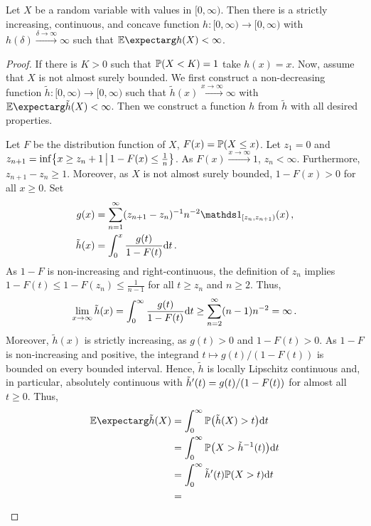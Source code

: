 %
\begin{lemma}\label{lmm:nondec:existence}
	Let $X$ be a random variable with values in $[0,\infty)$. Then there is a strictly increasing, continuous, and concave function $h \colon [0,\infty) \to [0,\infty)$ with $h(\delta)\xrightarrow{\delta\to\infty}\infty$ such that $\Ex{h(X)} < \infty$.
\end{lemma}
%
\begin{proof}
	If there is $K > 0$ such that $\mathbb{P}(X < K) = 1$ take $h(x) = x$. Now, assume that $X$ is not almost surely bounded.
	We first construct a non-decreasing function $\tilde h \colon [0,\infty) \to [0,\infty)$ such that $\tilde h (x) \xrightarrow{x\to\infty}\infty$ with $\Ex{\tilde h(X)} < \infty$.
	Then we construct a function $h$ from $\tilde h$ with all desired properties.
	
	Let $F$ be the distribution function of $X$, $F(x) = \mathbb{P}(X \leq x)$.
	Let $z_1 = 0$ and $z_{n+1} = \inf \mathopen{}\left\lbrace x\geq z_n +1 \,\big\vert\, 1-F(x) \leq \frac1n \right\rbrace\mathclose{}$. As $F(x)\xrightarrow{x\to\infty} 1$, $z_n < \infty$. Furthermore, $z_{n+1}-z_n \geq 1$. Moreover, as $X$ is not almost surely bounded, $1-F(x) > 0$ for all $x\geq 0$. Set 
	\begin{align*}
		g(x) &= \sum_{n=1}^\infty (z_{n+1}-z_n)^{-1}n^{-2}\ind_{[z_n, z_{n+1})} (x)
		\eqcm
		\\
		\tilde h(x) &= \int_0^x \frac{g(t)}{1-F(t)} \dl t
		\eqfs
	\end{align*}
	As $1-F$ is non-increasing and right-continuous, the definition of $z_n$ implies $1-F(t) \leq 1-F(z_n) \leq \frac1{n-1}$ for all $t\geq z_n$ and $n\geq2$. Thus,
	\begin{align*}
		\lim_{x\to\infty} \tilde h(x)
		=
		\int_0^\infty \frac{g(t)}{1-F(t)} \mathrm{d} t
		\geq
		\sum_{n=2}^\infty (n-1) n^{-2}
		=
		\infty
		\, .
	\end{align*}
	Moreover, $\tilde h(x)$ is strictly increasing, as $g(t) > 0$ and $1-F(t) > 0$.
	As $1-F$ is non-increasing and positive, the integrand $t \mapsto g(t)/(1-F(t))$ is bounded on every bounded interval. Hence, $\tilde h$ is locally Lipschitz continuous and, in particular, absolutely continuous with $\tilde h^\prime(t) = g(t)/(1-F(t))$ for almost all $t\geq0$. Thus,
	\begin{align*}
		\Ex{\tilde h(X)}
		&=
		\int_0^\infty \PrOf{\tilde h(X) > t} \dl t
		\\&=
		\int_0^\infty \PrOf{X > \tilde h^{-1}(t)} \dl t
		\\&=
		\int_0^\infty \tilde h\pr(t) \PrOf{X > t} \dl t
		\\&=

\end{align*}
\end{proof}

